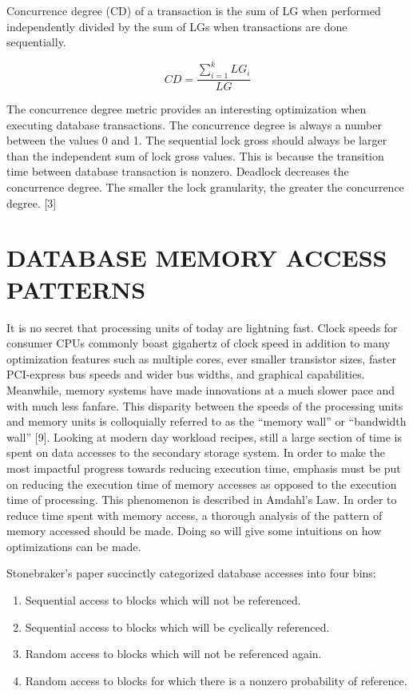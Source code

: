 \documentclass[letterpaper, 10 pt, conference]{ieeeconf}
\begin{document}
Concurrence degree (CD) of a transaction is the sum of LG when performed independently divided by the sum of LGs when transactions are done sequentially.

\begin{equation}
CD = \frac{\sum_{i=1}^{k}LG_i}{LG}
\end{equation}

The concurrence degree metric provides an interesting optimization when executing database transactions.  The concurrence degree is always a number between the values 0 and 1.  The sequential lock gross should always be larger than the independent sum of lock gross values.  This is because the transition time between database transaction is nonzero.  Deadlock decreases the concurrence degree.  The smaller the lock granularity, the greater the concurrence degree. [3]

\section{DATABASE MEMORY ACCESS PATTERNS}
It is no secret that processing units of today are lightning fast.  Clock speeds for consumer CPUs commonly boast gigahertz of clock speed in addition to many optimization features such as multiple cores, ever smaller transistor sizes, faster PCI-express bus speeds and wider bus widths, and graphical capabilities.  Meanwhile, memory systems have made innovations at a much slower pace and with much less fanfare.  This disparity between the speeds of the processing units and memory units is colloquially referred to as the “memory wall” or “bandwidth wall” [9].  Looking at modern day workload recipes, still a large section of time is spent on data accesses to the secondary storage system. In order to make the most impactful progress towards reducing execution time, emphasis must be put on reducing the execution time of memory accesses as opposed to the execution time of processing.  This phenomenon is described in Amdahl’s Law.  In order to reduce time spent with memory access, a thorough analysis of the pattern of memory accessed should be made.  Doing so will give some intuitions on how optimizations can be made.

Stonebraker’s paper succinctly categorized database accesses into four bins:

\begin{enumerate}
    \item Sequential access to blocks which will not be referenced.
    \item Sequential access to blocks which will be cyclically referenced.
    \item Random access to blocks which will not be referenced again.
    \item Random access to blocks for which there is a nonzero probability of reference.
\end{enumerate}
\end{document}
